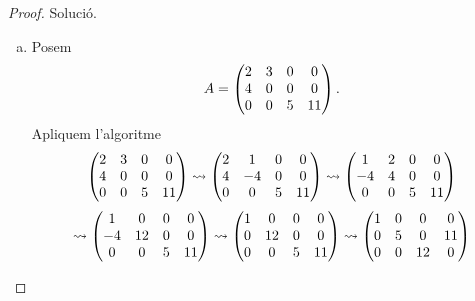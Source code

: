 \documentclass[../main.tex]{subfiles}
\begin{document}
\begin{proof}
Solució.
\begin{enumerate}[(a)]
    \item Posem
    \begin{equation}
        \notag
        A = 
        \begin{pmatrix}
            2 & 3 & 0 & 0 \\
            4 & 0 & 0 & 0 \\
            0 & 0 & 5 & 11
        \end{pmatrix}.
    \end{equation}
    Apliquem l'algoritme
    \begin{equation}
        \notag
        \begin{pmatrix}
            2 & 3 & 0 & 0 \\
            4 & 0 & 0 & 0 \\
            0 & 0 & 5 & 11
        \end{pmatrix}
        \leadsto
        \begin{pmatrix}
            2 & 1 & 0 & 0 \\
            4 & -4 & 0 & 0 \\
            0 & 0 & 5 & 11
        \end{pmatrix}
        \leadsto
        \begin{pmatrix}
            1 & 2 & 0 & 0 \\
            -4 & 4 & 0 & 0 \\
            0 & 0 & 5 & 11
        \end{pmatrix}
    \end{equation}
    \begin{equation}
        \notag\leadsto
        \begin{pmatrix}
            1 & 0 & 0 & 0 \\
            -4 & 12 & 0 & 0 \\
            0 & 0 & 5 & 11
        \end{pmatrix}
        \leadsto
        \begin{pmatrix}
            1 & 0 & 0 & 0 \\
            0 & 12 & 0 & 0 \\
            0 & 0 & 5 & 11
        \end{pmatrix}
        \leadsto
        \begin{pmatrix}
            1 & 0 & 0 & 0 \\
            0 & 5 & 0 & 11 \\
            0 & 0 & 12 & 0

\end{pmatrix}
\end{equation}
\end{enumerate}
\end{proof}
\end{document}
